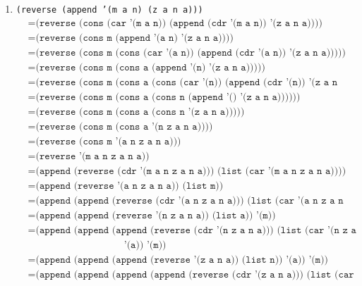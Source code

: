 \documentclass[letterpaper,11pt]{article}
\begin{document}
\begin{enumerate}
\begin{enumerate}
        \item \texttt{(reverse (append '(m a n) (z a n a)))}
        \begin{align*}
            &= \texttt{(reverse (cons (car '(m a n)) (append (cdr '(m a n)) '(z a n a))))} \\
            &= \texttt{(reverse (cons m (append '(a n) '(z a n a))))} \\
            &= \texttt{(reverse (cons m (cons (car '(a n)) (append (cdr '(a n)) '(z a n a)))))} \\
            &= \texttt{(reverse (cons m (cons a (append '(n) '(z a n a)))))} \\
            &= \texttt{(reverse (cons m (cons a (cons (car '(n)) (append (cdr '(n)) '(z a n a))))))} \\
            &= \texttt{(reverse (cons m (cons a (cons n (append '() '(z a n a))))))} \\
            &= \texttt{(reverse (cons m (cons a (cons n '(z a n a)))))} \\
            &= \texttt{(reverse (cons m (cons a '(n z a n a))))} \\
            &= \texttt{(reverse (cons m '(a n z a n a)))} \\
            &= \texttt{(reverse '(m a n z a n a))} \\
            &= \texttt{(append (reverse (cdr '(m a n z a n a))) (list (car '(m a n z a n a))))} \\
            &= \texttt{(append (reverse '(a n z a n a)) (list m))} \\
            &= \texttt{(append (append (reverse (cdr '(a n z a n a))) (list (car '(a n z a n a)))) '(m))} \\
            &= \texttt{(append (append (reverse '(n z a n a)) (list a)) '(m))} \\
            &= \texttt{(append (append (append (reverse (cdr '(n z a n a))) (list (car '(n z a n a))))} \\
            & \; \; \; \; \; \; \; \; \; \; \; \; \; \; \; \; \; \; \; \; \; \; \; 
              \; \; \; \; \; \; \; \; \; \; \; \; 
                                       \texttt{'(a)) '(m))} \\
            &= \texttt{(append (append (append (reverse '(z a n a)) (list n)) '(a)) '(m))} \\
            &= \texttt{(append (append (append (append (reverse (cdr '(z a n a))) (list (car '(z a n a))))} \\
            & \; \; \; \; \; \; \; \; \; \; \; \; \; \; \; \; \; \; \; \; \; \; \;

\end{align*}
\end{enumerate}
\end{enumerate}
\end{document}
